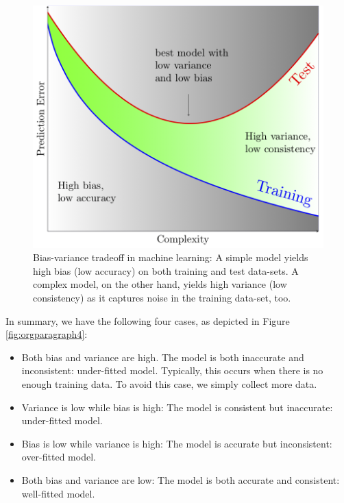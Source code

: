 \documentclass[11pt]{article}
\begin{document}
\begin{figure}[htb]
\centering
\includegraphics[width=.9\linewidth]{./images/bias-variance-tradeoff.png}
\caption{\label{fig:orgparagraph3}
Bias-variance tradeoff in machine learning: A simple model yields high bias (low accuracy) on both training and test data-sets. A complex model, on the other hand, yields high variance (low consistency) as it captures noise in the training data-set, too.}
\end{figure}

In summary, we have the following four cases, as depicted in Figure \ref{fig:orgparagraph4}:
\begin{itemize}
\item Both bias and variance are high. The model is both inaccurate and inconsistent: under-fitted model. Typically, this occurs when there is no enough training data. To avoid this case, we simply collect more data.
\item Variance is low while bias is high: The model is consistent but inaccurate: under-fitted model.
\item Bias is low while variance is high: The model is accurate but inconsistent: over-fitted model.
\item Both bias and variance are low: The model is both accurate and consistent: well-fitted model.
\end{itemize}
\end{document}
